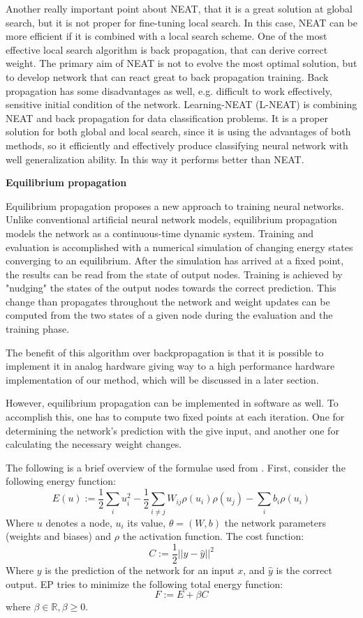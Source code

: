 \documentclass[lettersize,journal]{IEEEtran}
\newcommand{\eqprop}{EP }
\begin{document}
        Another really important point about NEAT, that it is a great solution at global search, but it is not proper for fine-tuning local search. In this case, NEAT can be more efficient if it is combined with a local search scheme. One of the most effective local search algorithm is back propagation, that can derive correct weight. The primary aim of NEAT is not to evolve the most optimal solution, but to develop network that can react great to back propagation training. Back propagation has some disadvantages as well, e.g. difficult to work effectively, sensitive initial condition of the network.
        Learning-NEAT (L-NEAT) is combining NEAT and back propagation for data classification problems. It is a proper solution for both global and local search, since it is using the advantages of both methods, so it efficiently and effectively produce classifying neural network with well generalization ability. In this way it performs better than NEAT.
  
        \textbf{Equilibrium propagation \cite{eqprop}}
        
		Equilibrium propagation proposes a new approach to training neural networks. Unlike conventional artificial neural network models, equilibrium propagation models the network as a continuous-time dynamic system. Training and evaluation is accomplished with a numerical simulation of changing energy states converging to an equilibrium. After the simulation has arrived at a fixed point, the results can be read from the state of output nodes. Training is achieved by "nudging" the states of the output nodes towards the correct prediction. This change than propagates throughout the network and weight updates can be computed from the two states of a given node during the evaluation and the training phase.

        The benefit of this algorithm over backpropagation is that it is possible to implement it in analog hardware \cite{hardware_eq} giving way to a high performance hardware implementation of our method, which will be discussed in a later section.

        However, equilibrium propagation can be implemented in software as well. To accomplish this, one has to compute two fixed points at each iteration. One for determining the network's prediction with the give input, and another one for calculating the necessary weight changes. 
        
        The following is a brief overview of the formulae used from \cite{eqprop}. First, consider the following energy function:
        $$E(u):=\frac{1}{2}\sum_iu_i^2-\frac{1}{2}\sum_{i\neq j}W_{ij}\rho(u_i)\rho(u_j)-\sum_ib_i\rho(u_i)$$ Where $u$ denotes a node, $u_i$ its value, $\theta=(W,b)$ the network parameters (weights and biases) and $\rho$ the activation function.
        The cost function: $$C:=\frac{1}{2}||y-\hat{y}||^2$$ Where $y$ is the prediction of the network for an input $x$, and $\hat{y}$ is the correct output.
        \eqprop tries to minimize the following total energy function:$$F:=E+\beta C$$ where $\beta\in\mathbb{R},\beta\geq0$.
        
\end{document}
